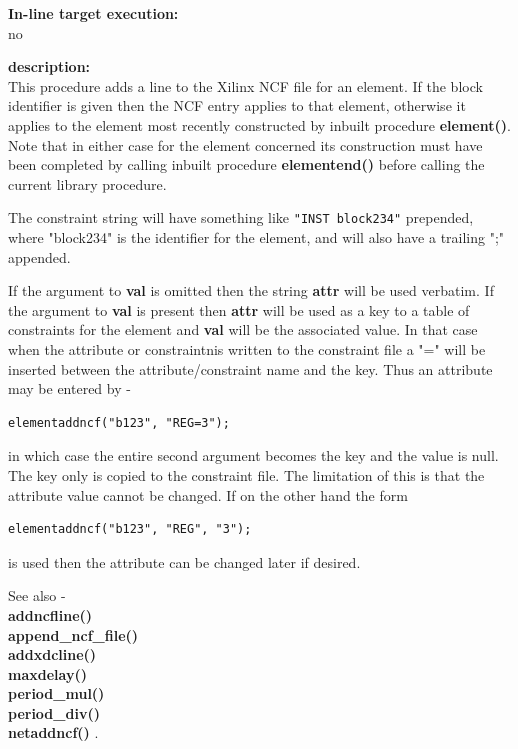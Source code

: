             {\bf In-line target execution:} \\
            no

            {\bf description:} \\
            This procedure adds a line to the Xilinx NCF file for an element. If
            the block identifier is given then the NCF entry applies to that
            element, otherwise it applies to the element most recently
            constructed by inbuilt procedure {\bf element()}. Note that in either case for the
            element concerned its construction must have been completed by
            calling inbuilt procedure {\bf elementend()} before calling the
            current library procedure.

            The constraint string will have something like
            \verb'"INST block234"' prepended, where "block234" is the identifier
            for the element, and will also have a trailing ";" appended.
            
            If the argument to {\bf val} is omitted then the string {\bf attr} will
            be used verbatim. If the argument to {\bf val} is present then
            {\bf attr} will be used as a key to a table of constraints for the element
            and {\bf val} will be the associated value. In that case when the attribute
            or constraintnis written to the constraint file a "=" will be inserted between
            the attribute/constraint name and the key. Thus an attribute may be
            entered by -
            \begin{lstlisting}[gobble=12, language=threepl]
               elementaddncf("b123", "REG=3");
            \end{lstlisting}
            in which case the entire second argument becomes the key and the
            value is null. The key only is copied to the constraint file. The
            limitation of this is that the attribute value cannot be changed.
            If on the other hand the form
            \begin{lstlisting}[gobble=12, language=threepl]
               elementaddncf("b123", "REG", "3");
            \end{lstlisting}
            is used then the attribute can be changed later if desired.

            See also - \\       
            {\bf addncfline()} \\
            {\bf append\_ncf\_file()} \\
            {\bf addxdcline()} \\
            {\bf maxdelay()} \\
            {\bf period\_mul()} \\
            {\bf period\_div()} \\
            {\bf netaddncf()} .






